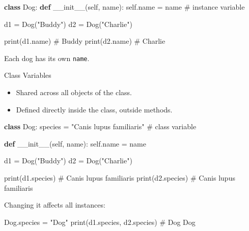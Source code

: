\documentclass[
  letterpaper,
  DIV=11,
  numbers=noendperiod]{scrreprt}
\newenvironment{Shaded}{\begin{snugshade}}{\end{snugshade}}
\newcommand{\BuiltInTok}[1]{\textcolor[rgb]{0.00,0.23,0.31}{#1}}
\newcommand{\CommentTok}[1]{\textcolor[rgb]{0.37,0.37,0.37}{#1}}
\newcommand{\FunctionTok}[1]{\textcolor[rgb]{0.28,0.35,0.67}{#1}}
\newcommand{\KeywordTok}[1]{\textcolor[rgb]{0.00,0.23,0.31}{\textbf{#1}}}
\newcommand{\NormalTok}[1]{\textcolor[rgb]{0.00,0.23,0.31}{#1}}
\newcommand{\OperatorTok}[1]{\textcolor[rgb]{0.37,0.37,0.37}{#1}}
\newcommand{\StringTok}[1]{\textcolor[rgb]{0.13,0.47,0.30}{#1}}
\newcommand{\VariableTok}[1]{\textcolor[rgb]{0.07,0.07,0.07}{#1}}
\providecommand{\tightlist}{%
  \setlength{\itemsep}{0pt}\setlength{\parskip}{0pt}}
\begin{document}
\begin{Shaded}
\begin{Highlighting}[]
\KeywordTok{class}\NormalTok{ Dog:}
    \KeywordTok{def} \FunctionTok{\_\_init\_\_}\NormalTok{(}\VariableTok{self}\NormalTok{, name):}
        \VariableTok{self}\NormalTok{.name }\OperatorTok{=}\NormalTok{ name    }\CommentTok{\# instance variable}

\NormalTok{d1 }\OperatorTok{=}\NormalTok{ Dog(}\StringTok{"Buddy"}\NormalTok{)}
\NormalTok{d2 }\OperatorTok{=}\NormalTok{ Dog(}\StringTok{"Charlie"}\NormalTok{)}

\BuiltInTok{print}\NormalTok{(d1.name)   }\CommentTok{\# Buddy}
\BuiltInTok{print}\NormalTok{(d2.name)   }\CommentTok{\# Charlie}
\end{Highlighting}
\end{Shaded}

Each dog has its own \texttt{name}.

Class Variables

\begin{itemize}
\tightlist
\item
  Shared across all objects of the class.
\item
  Defined directly inside the class, outside methods.
\end{itemize}

\begin{Shaded}
\begin{Highlighting}[]
\KeywordTok{class}\NormalTok{ Dog:}
\NormalTok{    species }\OperatorTok{=} \StringTok{"Canis lupus familiaris"}   \CommentTok{\# class variable}

    \KeywordTok{def} \FunctionTok{\_\_init\_\_}\NormalTok{(}\VariableTok{self}\NormalTok{, name):}
        \VariableTok{self}\NormalTok{.name }\OperatorTok{=}\NormalTok{ name}

\NormalTok{d1 }\OperatorTok{=}\NormalTok{ Dog(}\StringTok{"Buddy"}\NormalTok{)}
\NormalTok{d2 }\OperatorTok{=}\NormalTok{ Dog(}\StringTok{"Charlie"}\NormalTok{)}

\BuiltInTok{print}\NormalTok{(d1.species)   }\CommentTok{\# Canis lupus familiaris}
\BuiltInTok{print}\NormalTok{(d2.species)   }\CommentTok{\# Canis lupus familiaris}
\end{Highlighting}
\end{Shaded}

Changing it affects all instances:

\begin{Shaded}
\begin{Highlighting}[]
\NormalTok{Dog.species }\OperatorTok{=} \StringTok{"Dog"}
\BuiltInTok{print}\NormalTok{(d1.species, d2.species)  }\CommentTok{\# Dog Dog}
\end{Highlighting}
\end{Shaded}
\end{document}

